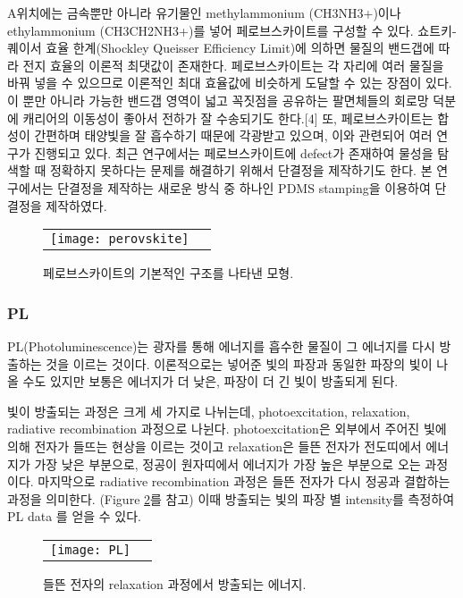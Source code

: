 A위치에는 금속뿐만 아니라 유기물인  methylammonium (CH3NH3+)이나 ethylammonium (CH3CH2NH3+)를 넣어 페로브스카이트를 구성할 수 있다. 쇼트키-퀘이서 효율 한계(Shockley Queisser Efficiency Limit)에 의하면 물질의 밴드갭에 따라 전지 효율의 이론적 최댓값이 존재한다. 페로브스카이트는 각 자리에 여러 물질을 바꿔 넣을 수 있으므로 이론적인 최대 효율값에 비슷하게 도달할 수  있는 장점이 있다. 이 뿐만 아니라 가능한 밴드갭 영역이 넓고 꼭짓점을 공유하는 팔면체들의 회로망 덕분에 캐리어의 이동성이 좋아서 전하가 잘 수송되기도 한다.[4] 
또, 페로브스카이트는 합성이 간편하며 태양빛을 잘 흡수하기 때문에 각광받고 있으며, 이와 관련되어 여러 연구가 진행되고 있다. 최근 연구에서는 페로브스카이트에 defect가 존재하여 물성을 탐색할 때 정확하지 못하다는 문제를 해결하기 위해서 단결정을 제작하기도 한다. 본 연구에서는 단결정을 제작하는 새로운 방식 중 하나인 PDMS stamping을 이용하여 단결정을 제작하였다.
\begin{figure}[t]
	\begin{center}
		\begin{tabular}{cc}
			\texttt{[image: perovskite]}
		\end{tabular}
	\end{center}
	\caption{페로브스카이트의 기본적인 구조를 나타낸 모형.}
	\label{fig:perov} 
\end{figure}
\subsubsection{PL}
PL(Photoluminescence)는 광자를 통해 에너지를 흡수한 물질이 그 에너지를 다시 방출하는 것을 이르는 것이다. 이론적으로는 넣어준 빛의 파장과 동일한 파장의 빛이 나올 수도 있지만 보통은 에너지가 더 낮은, 파장이 더 긴 빛이 방출되게 된다. 

빛이 방출되는 과정은 크게 세 가지로 나뉘는데, photoexcitation, relaxation, radiative recombination 과정으로 나뉜다. photoexcitation은 외부에서 주어진 빛에 의해 전자가 들뜨는 현상을 이르는 것이고 relaxation은 들뜬 전자가 전도띠에서 에너지가 가장 낮은 부분으로, 정공이 원자띠에서 에너지가 가장 높은 부분으로 오는 과정이다. 마지막으로 radiative recombination 과정은 들뜬 전자가 다시 정공과 결합하는 과정을 의미한다. (Figure \ref{fig:pl}를 참고) 이때 방출되는 빛의 파장 별 intensity를 측정하여 PL data 를 얻을 수 있다.
\begin{figure}[t]
	\begin{center}
		\begin{tabular}{cc}
			\texttt{[image: PL]}
		\end{tabular}
	\end{center}
	\caption{들뜬 전자의 relaxation 과정에서 방출되는 에너지.}
	\label{fig:pl} 
\end{figure}
